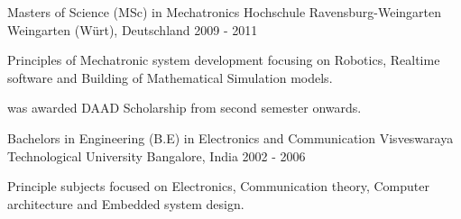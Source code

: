 

\begin{cventries}

  \cventry
    {Masters of Science (MSc) in Mechatronics} %
    {Hochschule Ravensburg-Weingarten} %
    {Weingarten (Würt), Deutschland} %
    {2009 - 2011} %
    {
      \begin{cvitems} %
        \item {Principles of Mechatronic system development focusing on Robotics, Realtime software and Building of Mathematical Simulation models.}
        \item {was awarded DAAD Scholarship from second semester onwards.}
      \end{cvitems}
    }


  \cventry
    {Bachelors in Engineering (B.E) in Electronics and Communication} %
    {Visveswaraya Technological University} %
    {Bangalore, India} %
    {2002 - 2006} %
    {
      \begin{cvitems} %
      \item {Principle subjects focused on Electronics, Communication theory, Computer architecture and Embedded system design.}
      \end{cvitems}
    }

\end{cventries}
